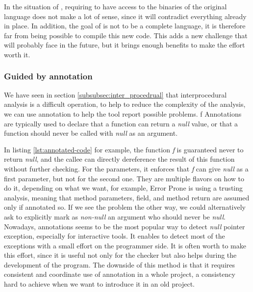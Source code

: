 In the situation of \slang{}, requiring to have access to the binaries of the original language does not make a lot of sense, since it will contradict everything already in place.
In addition, the goal of \slang{} is not to be a complete language, it is therefore far from being possible to compile this new code. 
This adds a new challenge that \slang{} will probably face in the future, but it brings enough benefits to make the effort worth it.

\subsubsection{Guided by annotation}
\label{subsubsec:guided_by_annotation}

We have seen in section \ref{subsubsec:inter_procedrual} that interprocedural analysis is a difficult operation, to help to reduce the complexity of the analysis, we can use annotation to help the tool report possible problems. f
Annotations are typically used to declare that a function can return a \emph{null} value, or that a function should never be called with \emph{null} as an argument.



In listing \ref{lst:annotated-code} for example, the function \emph{f} is guaranteed never to return \emph{null}, and the callee can directly dereference the result of this function without further checking.
For the parameters, it enforces that \emph{f} can give \emph{null} as a first parameter, but not for the second one.\newline
They are multiple flavors on how to do it, depending on what we want, for example, Error Prone is using a trusting analysis, meaning that method parameters, field, and method return are assumed \nullable{} only if annotated so. 
If we see the problem the other way, we could alternatively ask to explicitly mark as \emph{non-null} an argument who should never be \emph{null}.\newline
Nowadays, annotations seems to be the most popular way to detect \emph{null} pointer exception, especially for interactive tools.
It enables to detect most of the exceptions with a small effort on the programmer side.
It is often worth to make this effort, since it is useful not only for the checker but also helps during the development of the program.
The downside of this method is that it requires consistent and coordinate use of annotation in a whole project, a consistency hard to achieve when we want to introduce it in an old project.

